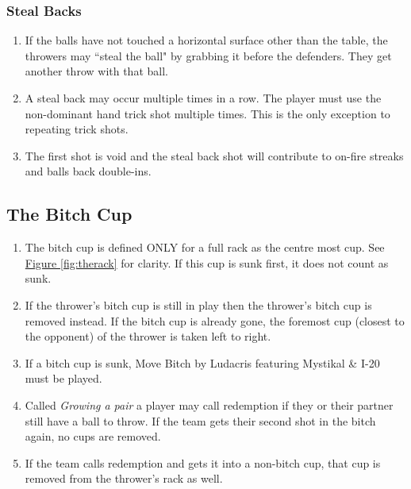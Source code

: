         \subsubsection{Steal Backs}\label{sssec:StealBacks}
        \begin{enumerate}[label=(\roman*), ref=\roman*]
            \item \label{itm:BallsBack,stealback} If the balls have not touched a horizontal surface other than the table, the throwers may ``steal the ball" by grabbing it before the defenders.
                They get another throw with that ball.
            \item \label{itm:BallsBack,stealback_multi} A steal back may occur multiple times in a row.
                The player must use the non-dominant hand trick shot multiple times. This is the only exception to repeating trick shots.
            \item \label{itm:BallsBack,stealback_redo} The first shot is void and the steal back shot will contribute to on-fire streaks and balls back double-ins.
        \end{enumerate}
	\subsection{The Bitch Cup}\label{ssec:BitchCup}
		\begin{enumerate}[label=(\roman*), ref=\roman*]
            \item \label{itm:BitchCup,def} The bitch cup is defined ONLY for a full rack as the centre most cup.
                See \hyperref[fig:therack]{Figure \ref*{fig:therack}} for clarity. If this cup is sunk first, it does not count as sunk.
            \item \label{itm:BitchCup,rem} If the thrower's bitch cup is still in play then the thrower's bitch cup is removed instead.
                If the bitch cup is already gone, the foremost cup (closest to the opponent) of the thrower is taken left to right.
            \item \label{itm:BitchCup,song} If a bitch cup is sunk, Move Bitch by Ludacris featuring Mystikal & I-20 must be played.
            \item \label{itm:BitchCup,redemption} Called \emph{Growing a pair} a player may call redemption if they or their partner still have a ball to throw.
                If the team gets their second shot in the bitch again, no cups are removed.
            \item \label{itm:BitchCup,redemptionFail} If the team calls redemption and gets it into a non-bitch cup, that cup is removed from the thrower's rack as well.
        \end{enumerate}
